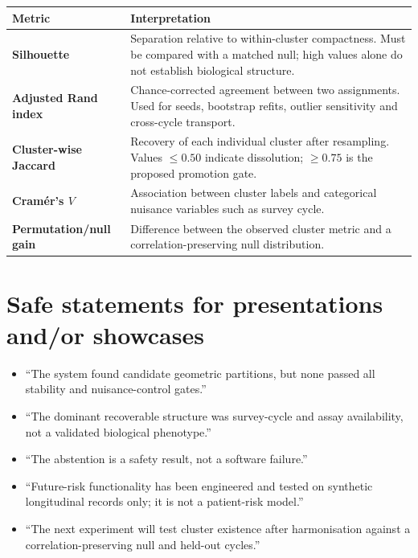 \documentclass[11pt,a4paper]{article}
\begin{document}
\begin{tabularx}{\textwidth}{>{\bfseries}p{34mm} X}
\toprule
Metric & Interpretation \\
\midrule
Silhouette & Separation relative to within-cluster compactness. Must be compared
with a matched null; high values alone do not establish biological structure. \\
Adjusted Rand index & Chance-corrected agreement between two assignments. Used
for seeds, bootstrap refits, outlier sensitivity and cross-cycle transport. \\
Cluster-wise Jaccard & Recovery of each individual cluster after resampling.
Values \(\leq0.50\) indicate dissolution; \(\geq0.75\) is the proposed promotion gate. \\
Cramér's \(V\) & Association between cluster labels and categorical nuisance
variables such as survey cycle. \\
Permutation/null gain & Difference between the observed cluster metric and a
correlation-preserving null distribution. \\
\bottomrule
\end{tabularx}

\section{Safe statements for presentations and/or showcases}

\begin{itemize}
  \item ``The system found candidate geometric partitions, but none passed all
  stability and nuisance-control gates.''
  \item ``The dominant recoverable structure was survey-cycle and assay
  availability, not a validated biological phenotype.''
  \item ``The abstention is a safety result, not a software failure.''
  \item ``Future-risk functionality has been engineered and tested on synthetic
  longitudinal records only; it is not a patient-risk model.''
  \item ``The next experiment will test cluster existence after harmonisation
  against a correlation-preserving null and held-out cycles.''
\end{itemize}
\end{document}
